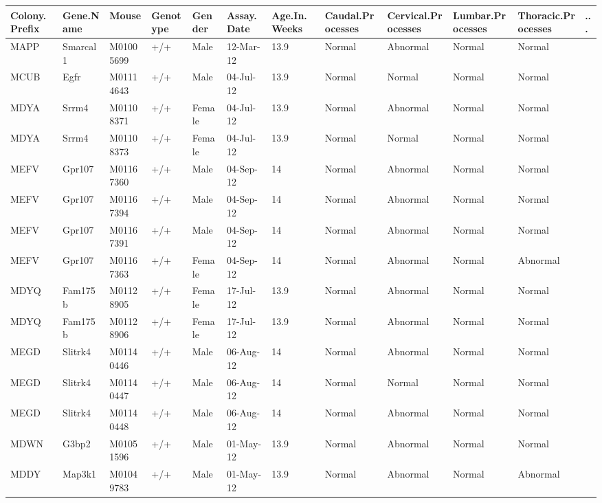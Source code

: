 \documentclass[12pt,a4paper]{article}
\begin{document}
\begin{table}
\begin{tabular}{| p{13mm} | p{15mm} | l | l | l | p{19mm}| p{12mm} |  p{16mm}  | p{17mm} | p{16mm} | p{17mm} | l |}
  \hline
Colony.\newline Prefix&Gene.\newline Name&Mouse&\textbf{Genotype}&\textbf{Gender}&\textbf{Assay.\newline Date}&Age.In.\newline Weeks&Caudal.\newline Processes&Cervical.\newline Processes&Lumbar.\newline Processes&Thoracic.\newline Processes& ... \\\hline
MAPP&Smarcal1&M01005699&+/+&Male&12-Mar-12&13.9&Normal&Abnormal&Normal&Normal&\\
MCUB&Egfr&M01114643&+/+&Male&04-Jul-12&13.9&Normal&Normal&Normal&Normal&\\
MDYA&Srrm4&M01108371&+/+&Female&04-Jul-12&13.9&Normal&Abnormal&Normal&Normal&\\
MDYA&Srrm4&M01108373&+/+&Female&04-Jul-12&13.9&Normal&Normal&Normal&Normal&\\
MEFV&Gpr107&M01167360&+/+&Male&04-Sep-12&14&Normal&Abnormal&Normal&Normal&\\
MEFV&Gpr107&M01167394&+/+&Male&04-Sep-12&14&Normal&Abnormal&Normal&Normal&\\
MEFV&Gpr107&M01167391&+/+&Male&04-Sep-12&14&Normal&Abnormal&Normal&Normal&\\
MEFV&Gpr107&M01167363&+/+&Female&04-Sep-12&14&Normal&Abnormal&Normal&Abnormal&\\
MDYQ&Fam175b&M01128905&+/+&Female&17-Jul-12&13.9&Normal&Abnormal&Normal&Normal&\\
MDYQ&Fam175b&M01128906&+/+&Female&17-Jul-12&13.9&Normal&Abnormal&Normal&Normal&\\
MEGD&Slitrk4&M01140446&+/+&Male&06-Aug-12&14&Normal&Abnormal&Normal&Normal&\\
MEGD&Slitrk4&M01140447&+/+&Male&06-Aug-12&14&Normal&Normal&Normal&Normal&\\
MEGD&Slitrk4&M01140448&+/+&Male&06-Aug-12&14&Normal&Abnormal&Normal&Normal&\\
MDWN&G3bp2&M01051596&+/+&Male&01-May-12&13.9&Normal&Abnormal&Normal&Normal&\\
MDDY&Map3k1&M01049783&+/+&Male&01-May-12&13.9&Normal&Abnormal&Normal&Abnormal&\\

\end{tabular}
\end{table}
\end{document}
